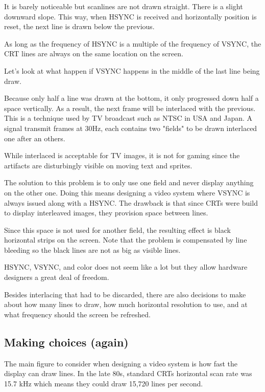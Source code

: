It is barely noticeable but scanlines are not drawn straight. There is a slight downward slope. This way, when HSYNC is received and horizontally position is reset, the next line is drawn below the previous.




As long as the frequency of HSYNC is a multiple of the frequency of VSYNC, the CRT lines are always on the same location on the screen.

Let's look at what happen if VSYNC happens in the middle of the last line being draw.


Because only half a line was drawn at the bottom, it only progressed down half a space vertically. As a result, the next frame will be interlaced with the previous. This is a technique used by TV broadcast such as NTSC in USA and Japan. A signal transmit frames at 30Hz, each contains two "fields" to be drawn interlaced one after an others.

While interlaced is acceptable for TV images, it is not for gaming since the artifacts are disturbingly visible on moving text and sprites. 

The solution to this problem is to only use one field and never display anything on the other one. Doing this means designing a video system where VSYNC is always issued along with a HSYNC. The drawback is that since CRTs were build to display interleaved images, they provision space between lines. 

Since this space is not used for another field, the resulting effect is black horizontal strips on the screen. Note that the problem is compensated by line bleeding so the black lines are not as big as visible lines.


HSYNC, VSYNC, and color does not seem like a lot but they allow hardware designers a great deal of freedom. 

Besides interlacing that had to be discarded, there are also decisions to make about how many lines to draw, how much horizontal resolution to use, and at what frequency should the screen be refreshed.





\subsection{Making choices (again)}
 The main figure to consider when designing a video system is how fast the display can draw lines. In the late 80s, standard CRTs horizontal scan rate was 15.7 kHz which means they could draw 15,720 lines per second.





